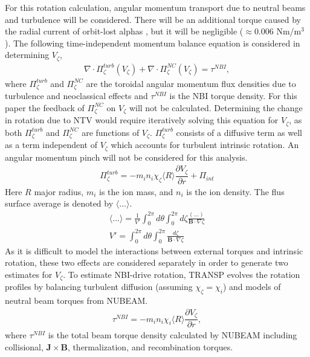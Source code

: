 \documentclass{article}
\numberwithin{figure}{section}
\numberwithin{equation}{section}
\newcommand{\partder}[2]{\dfrac{\partial  #1}{\partial  #2}} %
\begin{document}
For this rotation calculation, angular momentum transport due to neutral beams and turbulence will be considered. There will be an additional torque caused by the radial current of orbit-lost alphas \cite{Rosenbluth1996}, but it will be negligible ($\approx 0.006$ Nm/m$^3$). The following time-independent momentum balance equation is considered in determining $V_{\zeta}$,
\begin{gather}
\nabla \cdot \Pi_{\zeta}^{turb}(V_{\zeta}) + \nabla \cdot \Pi_{\zeta}^{NC}(V_{\zeta}) = \tau^{NBI},
\end{gather}
where $\Pi^{turb}_{\zeta}$ and $\Pi^{NC}_{\zeta}$ are the toroidal angular momentum flux densities due to turbulence and neoclassical effects and $\tau^{NBI}$ is the NBI torque density. For this paper the feedback of $\Pi_{\zeta}^{NC}$ on $V_{\zeta}$ will not be calculated. Determining the change in rotation due to NTV would require iteratively solving this equation for $V_{\zeta}$, as both $\Pi_{\zeta}^{turb}$ and $\Pi_{\zeta}^{NC}$ are functions of $V_{\zeta}$. $\Pi_{\zeta}^{turb}$ consists of a diffusive term as well as a term independent of $V_{\zeta}$ which accounts for turbulent intrinsic rotation. An angular momentum pinch will not be considered for this analysis. 
\begin{gather}
\Pi_{\zeta}^{turb} = -m_i n_i \chi_{\zeta} \langle R \rangle\partder{V_{\zeta}}{r} + \Pi_{int}
\end{gather}
Here $R$ major radius, $m_i$ is the ion mass, and $n_i$ is the ion density. The flus surface average is denoted by $\langle ... \rangle$.
\begin{gather}
\langle ... \rangle = \frac{1}{V'} \int_0^{2 \pi} d \theta \int_0^{2 \pi} d \zeta \frac{ (...)}{\bm{B} \cdot \nabla \zeta}
\\ V' = \int_0^{2\pi} d \theta \int_0^{2 \pi} \frac{d \zeta}{\bm{B} \cdot \nabla \zeta}
\end{gather}
As it is difficult to model the interactions between external torques and intrinsic rotation, these two effects are considered separately in order to generate two estimates for $V_{\zeta}$. To estimate NBI-drive rotation, TRANSP evolves the rotation profiles by balancing turbulent diffusion (assuming $\chi_{\zeta} = \chi_{i}$) and models of neutral beam torques from NUBEAM. 
\begin{gather}
\tau^{NBI} = -m_i n_i \chi_{i} \langle R \rangle \partder{V_{\zeta}}{r},
\end{gather}
where $\tau^{NBI}$ is the total beam torque density calculated by NUBEAM including collisional, $\bm{J} \times \bm{B}$, thermalization, and recombination torques.
\end{document}
